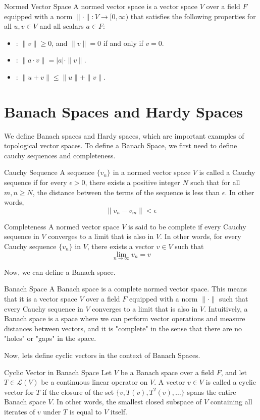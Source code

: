 \documentclass[openany]{book}
\begin{document}
\begin{mydefinition}{Normed Vector Space}
A normed vector space is a vector space $V$ over a field $F$ equipped with a norm $\|\cdot\|: V \to [0, \infty)$ that satisfies the following properties for all $u, v \in V$ and all scalars $a \in F$:
\begin{itemize}
    \item {}: $\|v\| \geq 0$, and $\|v\| = 0$ if and only if $v = 0$.
    \item {}: $\|a \cdot v\| = |a| \cdot \|v\|$.
    \item {}: $\|u + v\| \leq \|u\| + \|v\|$.
\end{itemize}
\end{mydefinition}
\section{Banach Spaces and Hardy Spaces}
We define Banach spaces and Hardy spaces, which are important examples of topological vector spaces. To define a Banach Space, we first need to define cauchy sequences and completeness.
\begin{mydefinition}{Cauchy Sequence}
A sequence $\{v_n\}$ in a normed vector space $V$ is called a Cauchy sequence if for every $\epsilon > 0$, there exists a positive integer $N$ such that for all $m, n \geq N$, the distance between the terms of the sequence is less than $\epsilon$. In other words,
\[\|v_n - v_m\| < \epsilon\]
\end{mydefinition}
\begin{mydefinition}{Completeness}
A normed vector space $V$ is said to be complete if every Cauchy sequence in $V$ converges to a limit that is also in $V$. In other words, for every Cauchy sequence $\{v_n\}$ in $V$, there exists a vector $v \in V$ such that
\[\lim_{n \to \infty} v_n = v\]
\end{mydefinition}
Now, we can define a Banach space.
\begin{mydefinition}{Banach Space}
A Banach space is a complete normed vector space. This means that it is a vector space $V$ over a field $F$ equipped with a norm $\|\cdot\|$ such that every Cauchy sequence in $V$ converges to a limit that is also in $V$.
Intuitively, a Banach space is a space where we can perform vector operations and measure distances between vectors, and it is "complete" in the sense that there are no "holes" or "gaps" in the space.
\end{mydefinition}
Now, lets define cyclic vectors in the context of Banach Spaces. 
\begin{mydefinition}{Cyclic Vector in Banach Space}
Let $V$ be a Banach space over a field $F$, and let $T \in \mathcal{L}(V)$ be a continuous linear operator on $V$. A vector $v \in V$ is called a cyclic vector for $T$ if the closure of the set $\{v, T(v), T^2(v), \ldots\}$ spans the entire Banach space $V$. In other words, the smallest closed subspace of $V$ containing all iterates of $v$ under $T$ is equal to $V$ itself.
\end{mydefinition}
\end{document}
